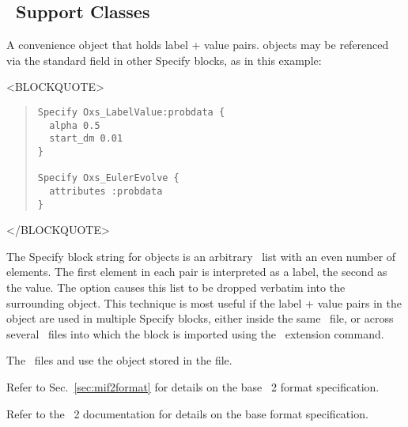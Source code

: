 \subsection{\MIF\ Support Classes}\label{oxsMIF}
\begin{description}
%
\item[Oxs\_LabelValue:]
   A convenience object that holds label + value
   pairs.   objects may be referenced via the
   standard  field in other Specify blocks, as in
   this example:
\begin{rawhtml}
<BLOCKQUOTE>
\end{rawhtml}
\begin{quote}
\begin{verbatim}
Specify Oxs_LabelValue:probdata {
  alpha 0.5
  start_dm 0.01
}

Specify Oxs_EulerEvolve {
  attributes :probdata
}
\end{verbatim}
\end{quote}
\begin{rawhtml}
</BLOCKQUOTE>
\end{rawhtml}
   The Specify block string for  objects is an
   arbitrary \Tcl\ list with an even number of elements.  The first
   element in each pair is interpreted as a label, the second as the
   value.  The  option causes this list to be dropped
   verbatim into the surrounding object.  This technique is most useful
   if the label + value pairs in the  object are
   used in multiple Specify blocks, either inside the same \MIF\
   file, or across several \MIF\ files into which the
    block is imported using the  \MIF\
   extension command.

   \begin{ExampleMifs}
     The \MIF\ files  and
      use the  object
     stored in the \fn{sample-attributes.tcl} file.
   \end{ExampleMifs}

\end{description}

Refer to Sec.~\ref{sec:mif2format} for details on the base \MIF~2
format specification.
\begin{htmlonly}
Refer to the \MIF~2 documentation for details on the base format
specification.
\end{htmlonly}

